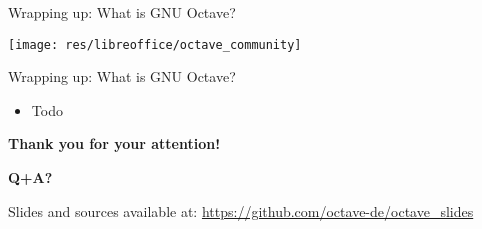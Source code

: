 \begin{frame}{Wrapping up: What is GNU Octave?}
\begin{center}
\texttt{[image: res/libreoffice/octave\_community]}
\end{center}
\end{frame}



\begin{frame}{Wrapping up: What is GNU Octave?}
\begin{itemize}
\item
Todo
\end{itemize}
\end{frame}



\begin{frame}
\begin{center}
\textbf{\Large Thank you for your attention!}

\bigskip

\textbf{\Large Q+A?}
\end{center}
\vfill
Slides and sources available at:
{\color{DarkBlue}\url{https://github.com/octave-de/octave_slides}}
\end{frame}
